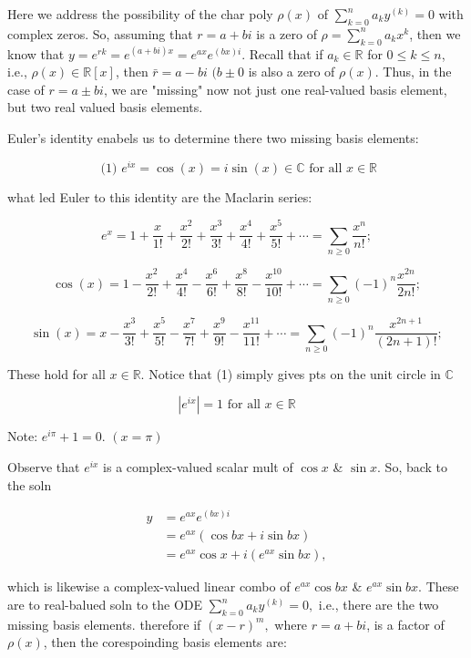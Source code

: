 \documentclass[12pt,a4paper]{article}
\theoremstyle{definition}
\begin{document}
Here we address the possibility of the char poly \( \rho(x) \) of \(
\sum_{k=0}^{n} a_ky^{(k)} = 0  \) with complex zeros. So, assuming that
\( r = a + bi \) is a zero of \( \rho = \sum_{k=0}^{n} a_k x^k \), then
we know that \( y= e^{rk} = e^{(a+bi)x} = e^{ax} e^{(bx)i}\). Recall
that if \( a_k \in \mathbb{R} \) for \( 0 \leq k \leq n \), i.e., \(
\rho(x) \in \mathbb{R}[x] \), then \( \bar{r} = a-bi\) \( (b \pm 0 \) is
also a zero of \( \rho(x) \). Thus, in the case of \( r = a \pm bi \),
we are "missing" now not just one real-valued basis element, but two
real valued basis elements. 

Euler's identity enabels us to determine there two missing basis
elements: 

\[ \text{ (1) } e^{ix} = \cos(x) = i\sin(x) \in \mathbb{C} \text{ for all } x \in
\mathbb{R} \]

what led Euler to this identity are the Maclarin series: 

\[ e^x = 1 + \frac{x}{1!} + \frac{x^2}{2!} + \frac{x^3}{3!}+
\frac{x^4}{4!}+ \frac{x^5}{5!} + \cdots = \sum_{n \geq 0} \frac{x^n}{n!};\]

\[ \cos(x) = 1 - \frac{x^2}{2!} +
\frac{x^4}{4!} - \frac{x^6}{6!} + \frac{x^8}{8!} - \frac{x^10}{10!} +
\cdots = \sum_{n \geq 0} (-1)^n \frac{x^{2n}}{2n!};\]

\[ \sin(x) =  x -  \frac{x^3}{3!} + \frac{x^5}{5!} - \frac{x^7}{7!} +
\frac{x^9}{9!} - \frac{x^11}{11!} + \cdots = \sum_{n \geq 0} (-1)^n
\frac{x^{2n +1}}{(2n+1)!};\]

These hold for all \( x \in \mathbb{R} \). Notice that (1) simply gives
pts on the unit circle in \( \mathbb{C} \)

\[ |e^{ix}| = 1 \text{ for all } x \in \mathbb{R} \]

Note: \( e^{i \pi} + 1 = 0. \) \( (x = \pi) \)

Observe that \( e^{ix} \) is a complex-valued scalar mult of \( \cos x
\) \& \( \sin x \). So, back to the soln

\begin{align*}
  y &= e^{ax} e^{(bx)i} \\
  &=e^{ax}(\cos bx + i \sin bx) \\
  &= e^{ax} \cos x + i(e^{ax} \sin bx),
\end{align*}

which is likewise a complex-valued linear combo of \( e^{ax} \cos bx \) \& \(
e^{ax} \sin bx \). These are to real-balued soln to the ODE \(
\sum_{k=0}^{n}a_ky^{(k)} =0, \) i.e., there are the two missing basis
elements. therefore if \( (x-r)^m, \) where \( r = a +bi \), is a factor
of \( \rho(x) \), then the corespoinding basis elements are: 
\end{document}
